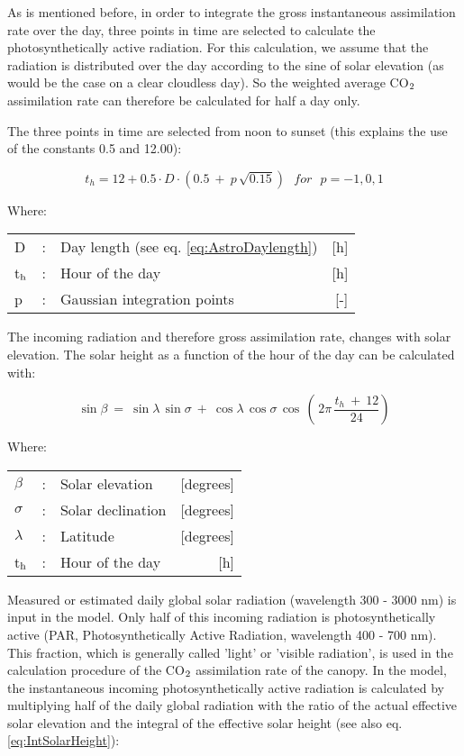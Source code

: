 As is mentioned before, in order to integrate the gross instantaneous assimilation rate
over the day, three points in time are selected to calculate the photosynthetically active
radiation. For this calculation, we assume that the radiation is distributed over the day 
according to the sine of solar elevation (as would be the case on a clear cloudless day).
So the weighted average CO$_{{\rm 2}}$ assimilation rate can therefore be calculated for half a day only.

The three points in time are selected from noon to sunset (this explains the use of the
constants 0.5 and 12.00):

\begin{equation}
t_{h} = 12 + 0.5 \cdot D \cdot (0.5 ~+~ p\, \sqrt{0.15}) ~~~ for ~~~ p = -1,0,1
\end{equation}

Where:\\[5pt]
\begin{tabularx}{\textwidth}{llXr}
	D &:& Day length (see eq. \ref{eq:AstroDaylength})    &    [h]\\
	t$_{{\rm h}}$ &:& Hour of the day  &      [h]\\
	p &:& Gaussian integration points  &      [-]\\
\end{tabularx}

The incoming radiation and therefore gross assimilation rate, changes with solar elevation. 
The solar height as a function of the hour of the day can be calculated with:

\begin{equation}
\label{eq:5.7}
\sin \beta ~=~ \sin \lambda \, \sin \sigma ~+~ \cos \lambda \, \cos \sigma \, \cos \, 
(\, 2 \pi \,{\frac{t _{h} ~+~ 12}{24}} )
\end{equation}


Where:\\[5pt]
\begin{tabularx}{\textwidth}{llXr}
	$\beta$ &:& Solar elevation   &    [degrees]\\
	$\sigma$ &:& Solar declination    &    [degrees]\\
	$\lambda$ &:& Latitude     &   [degrees]\\
	t$_{{\rm h}}$ &:& Hour of the day    &    [h]\\
\end{tabularx}

Measured or estimated daily global solar radiation  (wavelength 300 - 3000 nm) is input
in the model. Only half of this incoming radiation is photosynthetically active (PAR,
Photosynthetically Active Radiation, wavelength 400 - 700 nm). This fraction, which is
generally called 'light' or 'visible radiation', is used in the calculation procedure of the
CO$_{{\rm 2}}$ assimilation rate of the canopy. In the model, the instantaneous incoming 
photosynthetically active radiation is calculated by multiplying half of the daily global radiation
with the ratio of the actual effective solar elevation and the integral of the effective solar
height (see also eq. \ref{eq:IntSolarHeight}):

